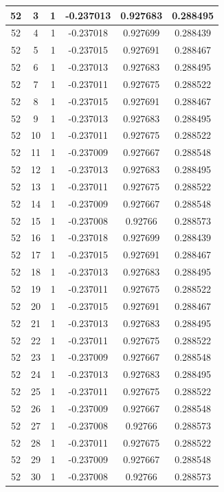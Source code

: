 \documentclass[12pt,a4paper]{article}
\numberwithin{equation}{section}
\numberwithin{figure}{section}
\numberwithin{table}{section}
\begin{document}
\begin{longtable}{|c|c|c|c|c|c|}
52 & 3 & 1 & -0.237013 & 0.927683 & 0.288495 \\ \hline
52 & 4 & 1 & -0.237018 & 0.927699 & 0.288439 \\ \hline
52 & 5 & 1 & -0.237015 & 0.927691 & 0.288467 \\ \hline
52 & 6 & 1 & -0.237013 & 0.927683 & 0.288495 \\ \hline
52 & 7 & 1 & -0.237011 & 0.927675 & 0.288522 \\ \hline
52 & 8 & 1 & -0.237015 & 0.927691 & 0.288467 \\ \hline
52 & 9 & 1 & -0.237013 & 0.927683 & 0.288495 \\ \hline
52 & 10 & 1 & -0.237011 & 0.927675 & 0.288522 \\ \hline
52 & 11 & 1 & -0.237009 & 0.927667 & 0.288548 \\ \hline
52 & 12 & 1 & -0.237013 & 0.927683 & 0.288495 \\ \hline
52 & 13 & 1 & -0.237011 & 0.927675 & 0.288522 \\ \hline
52 & 14 & 1 & -0.237009 & 0.927667 & 0.288548 \\ \hline
52 & 15 & 1 & -0.237008 & 0.92766 & 0.288573 \\ \hline
52 & 16 & 1 & -0.237018 & 0.927699 & 0.288439 \\ \hline
52 & 17 & 1 & -0.237015 & 0.927691 & 0.288467 \\ \hline
52 & 18 & 1 & -0.237013 & 0.927683 & 0.288495 \\ \hline
52 & 19 & 1 & -0.237011 & 0.927675 & 0.288522 \\ \hline
52 & 20 & 1 & -0.237015 & 0.927691 & 0.288467 \\ \hline
52 & 21 & 1 & -0.237013 & 0.927683 & 0.288495 \\ \hline
52 & 22 & 1 & -0.237011 & 0.927675 & 0.288522 \\ \hline
52 & 23 & 1 & -0.237009 & 0.927667 & 0.288548 \\ \hline
52 & 24 & 1 & -0.237013 & 0.927683 & 0.288495 \\ \hline
52 & 25 & 1 & -0.237011 & 0.927675 & 0.288522 \\ \hline
52 & 26 & 1 & -0.237009 & 0.927667 & 0.288548 \\ \hline
52 & 27 & 1 & -0.237008 & 0.92766 & 0.288573 \\ \hline
52 & 28 & 1 & -0.237011 & 0.927675 & 0.288522 \\ \hline
52 & 29 & 1 & -0.237009 & 0.927667 & 0.288548 \\ \hline
52 & 30 & 1 & -0.237008 & 0.92766 & 0.288573 \\ \hline

\end{longtable}
\end{document}
